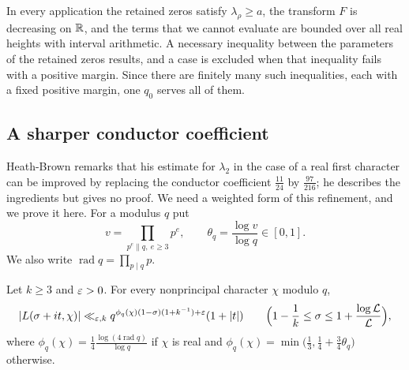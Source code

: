 In every application the retained zeros satisfy $\lambda_\rho\ge a$, the transform $F$ is decreasing on
$\mathbb{R}$, and the terms that we cannot evaluate are bounded over all real heights with interval
arithmetic. A necessary inequality between the parameters of the retained zeros results, and a
case is excluded when that inequality fails with a positive margin. Since there are finitely many
such inequalities, each with a fixed positive margin, one $q_0$ serves all of them.

\subsection{A sharper conductor coefficient}\label{subsec:conductor}
Heath-Brown remarks \cite[\S16, item~4]{HeathBrown1992zero} that his estimate for $\lambda_2$ in the
case of a real first character can be improved by replacing the conductor coefficient $\frac{11}{24}$
by $\frac{97}{216}$; he describes the ingredients but gives no proof. We need a weighted form of this
refinement, and we prove it here. For a modulus $q$ put
\[
  v=\prod_{p^e\parallel q,\ e\ge3}p^e,\qquad \theta_q=\frac{\log v}{\log q}\in[0,1] .
\]
We also write $\operatorname{rad}q=\prod_{p\mid q}p$.

\begin{lemma}\label{lem:Lbounds}
Let $k\ge3$ and $\varepsilon>0$. For every nonprincipal character $\chi$ modulo $q$,
\[
  |L(\sigma+it,\chi)|\ll_{\varepsilon,k}q^{\phi_q(\chi)(1-\sigma)(1+k^{-1})+\varepsilon}(1+|t|)\qquad
  \Bigl(1-\frac1k\le\sigma\le1+\frac{\log\mathcal{L}}{\mathcal{L}}\Bigr),
\]
where $\phi_q(\chi)=\frac14\frac{\log(4\operatorname{rad}q)}{\log q}$ if $\chi$ is real and
$\phi_q(\chi)=\min\bigl(\frac13,\frac14+\frac34\theta_q\bigr)$ otherwise.
\end{lemma}

